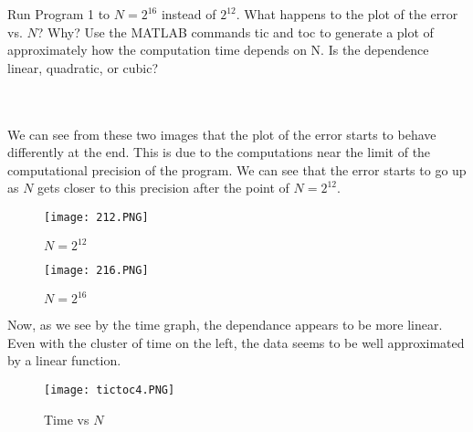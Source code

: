Run Program 1 to $N=2^{16}$ instead of $2^{12}$. What happens to the plot of the error vs. $N$? Why? Use
the MATLAB commands tic and toc to generate a plot of approximately how the computation time depends on
N. Is the dependence linear, quadratic, or cubic?\\\\

\begin{solution}\renewcommand{\qedsymbol}{}\ \\
    We can see from these two images that the plot of the error starts to behave differently at the end.
    This is due to the computations near the limit of the computational precision of the program. We can
    see that the error starts to go up as $N$ gets closer to this precision after the point of
    $N=2^{12}$.

    \begin{figure}[htp]
        \centering
        \texttt{[image: 212.PNG]}
        \caption{$N=2^{12}$}
    \end{figure}
    \begin{figure}[htp]
        \centering
        \texttt{[image: 216.PNG]}
        \caption{$N=2^{16}$}
    \end{figure}

    Now, as we see by the time graph, the dependance appears to be more linear. Even with the cluster of
    time on the left, the data seems to be well approximated by a linear function.

    \begin{figure}[htp]
        \centering
        \texttt{[image: tictoc4.PNG]}
        \caption{Time vs $N$}
    \end{figure}

\end{solution}

\newpage

\newpage